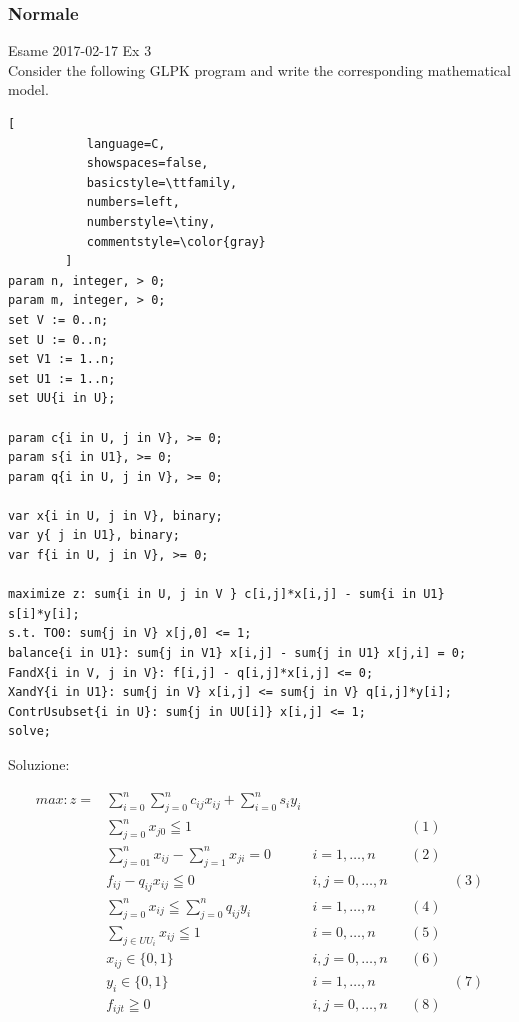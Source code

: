 \documentclass{article}
\begin{document}
\subsubsection{Normale}
Esame 2017-02-17 Ex 3\\

 Consider the following GLPK program and write the corresponding
mathematical model.\\
\begin{lstlisting}[
           language=C,
           showspaces=false,
           basicstyle=\ttfamily,
           numbers=left,
           numberstyle=\tiny,
           commentstyle=\color{gray}
        ]
param n, integer, > 0;
param m, integer, > 0;
set V := 0..n;
set U := 0..n;
set V1 := 1..n;
set U1 := 1..n;
set UU{i in U};

param c{i in U, j in V}, >= 0;
param s{i in U1}, >= 0;
param q{i in U, j in V}, >= 0;

var x{i in U, j in V}, binary;
var y{ j in U1}, binary;
var f{i in U, j in V}, >= 0;

maximize z: sum{i in U, j in V } c[i,j]*x[i,j] - sum{i in U1} s[i]*y[i];
s.t. TO0: sum{j in V} x[j,0] <= 1;
balance{i in U1}: sum{j in V1} x[i,j] - sum{j in U1} x[j,i] = 0;
FandX{i in V, j in V}: f[i,j] - q[i,j]*x[i,j] <= 0;
XandY{i in U1}: sum{j in V} x[i,j] <= sum{j in V} q[i,j]*y[i];
ContrUsubset{i in U}: sum{j in UU[i]} x[i,j] <= 1;
solve;
\end{lstlisting}

Soluzione:\\
\begin{center}
\begin{align*}
max : z= &\displaystyle \sum_{i=0}^{n} \sum_{j=0}^{n} c_{ij} x_{ij} + \sum_{i=0}^{n} s_i y_i\\
&\displaystyle \sum_{j=0}^{n} x_{j0} \leqq 1  &  &  & (1)\\
&\displaystyle \sum_{j=01}^{n} x_{ij} - \sum_{j=1}^{n} x_{ji} = 0 & i=1,\dots,n & &    (2)\\
&\displaystyle f_{ij} - q_{ij}x_{ij} \leqq 0 & i,j = 0,\dots,n & & & (3)\\
&\displaystyle \sum_{j=0}^{n} x_{ij} \leqq \sum_{j=0}^{n} q_{ij} y_i & i= 1,\dots,n  & & (4)\\
&\displaystyle \sum_{j \in UU_i} x_{ij} \leqq 1 & i= 0,\dots,n & & (5)\\
&x_{ij} \in \{0,1\} & i,j=0,\dots,n  & & (6)\\
&y_i \in \{0,1\} & i=1,\dots,n & & & (7)\\
&f_{ijt} \geqq 0 & i,j=0,\dots,n & & (8)
\end{align*}
\end{center}
\end{document}

